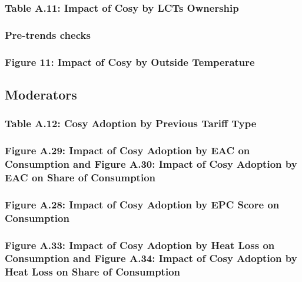 \documentclass[
]{article}
\begin{document}
\subsubsection{Table A.11: Impact of Cosy by LCTs Ownership}\label{table-a.11-impact-of-cosy-by-lcts-ownership}

\subsubsection{Pre-trends checks}\label{pre-trends-checks}

\subsubsection{Figure 11: Impact of Cosy by Outside Temperature}\label{figure-11-impact-of-cosy-by-outside-temperature}

\subsection{Moderators}\label{moderators}

\subsubsection{Table A.12: Cosy Adoption by Previous Tariff Type}\label{table-a.12-cosy-adoption-by-previous-tariff-type}

\subsubsection{Figure A.29: Impact of Cosy Adoption by EAC on Consumption and Figure A.30: Impact of Cosy Adoption by EAC on Share of Consumption}\label{figure-a.29-impact-of-cosy-adoption-by-eac-on-consumption-and-figure-a.30-impact-of-cosy-adoption-by-eac-on-share-of-consumption}

\subsubsection{Figure A.28: Impact of Cosy Adoption by EPC Score on Consumption}\label{figure-a.28-impact-of-cosy-adoption-by-epc-score-on-consumption}

\subsubsection{Figure A.33: Impact of Cosy Adoption by Heat Loss on Consumption and Figure A.34: Impact of Cosy Adoption by Heat Loss on Share of Consumption}\label{figure-a.33-impact-of-cosy-adoption-by-heat-loss-on-consumption-and-figure-a.34-impact-of-cosy-adoption-by-heat-loss-on-share-of-consumption}
\end{document}
